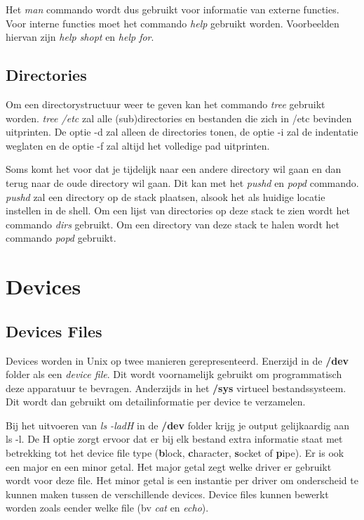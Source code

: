\documentclass{report}
\begin{document}
Het \textit{man} commando wordt dus gebruikt voor informatie van externe functies. Voor interne functies moet het commando \textit{help} gebruikt worden. Voorbeelden hiervan zijn \textit{help shopt} en \textit{help for}.

\section{Directories}
Om een directorystructuur weer te geven kan het commando \textit{tree} gebruikt worden. \textit{tree /etc} zal alle (sub)directories en bestanden die zich in /etc bevinden uitprinten. De optie -d zal alleen de directories tonen, de optie -i zal de indentatie weglaten en de optie -f zal altijd het volledige pad uitprinten.

Soms komt het voor dat je tijdelijk naar een andere directory wil gaan en dan terug naar de oude directory wil gaan. Dit kan met het \textit{pushd} en \textit{popd} commando. \textit{pushd} zal een directory op de stack plaatsen, alsook het als huidige locatie instellen in de shell. Om een lijst van directories op deze stack te zien wordt het commando \textit{dirs} gebruikt. Om een directory van deze stack te halen wordt het commando \textit{popd} gebruikt.
\chapter{Devices}
\section{Devices Files}
Devices worden in Unix op twee manieren gerepresenteerd. Enerzijd in de \textbf{/dev} folder als een \textit{device file}. Dit wordt voornamelijk gebruikt om programmatisch deze apparatuur te bevragen. Anderzijds in het \textbf{/sys} virtueel bestandssysteem. Dit wordt dan gebruikt om detailinformatie per device te verzamelen.

Bij het uitvoeren van \textit{ls -ladH} in de \textbf{/dev} folder krijg je output gelijkaardig aan ls -l. De H optie zorgt ervoor dat er bij elk bestand extra informatie staat met betrekking tot het device file type (\textbf{b}lock, \textbf{c}haracter, \textbf{s}ocket of \textbf{p}ipe). Er is ook een major en een minor getal. Het major getal zegt welke driver er gebruikt wordt voor deze file. Het minor getal is een instantie per driver om onderscheid te kunnen maken tussen de verschillende devices. Device files kunnen bewerkt worden zoals eender welke file (bv \textit{cat} en \textit{echo}).
\end{document}
